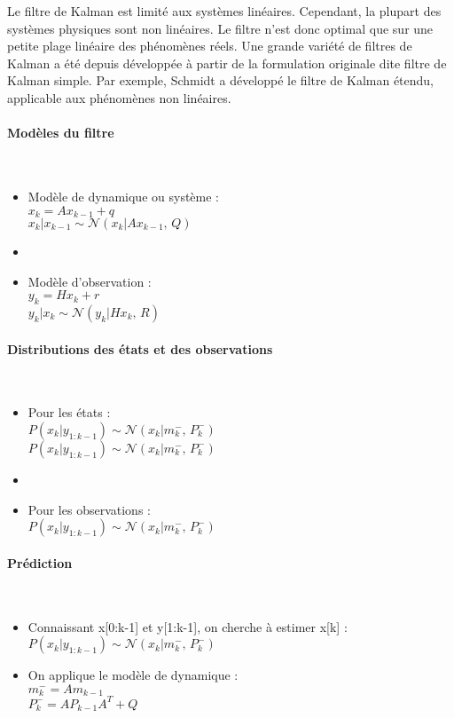 Le filtre de Kalman est limité aux systèmes linéaires. Cependant, la plupart des systèmes physiques sont non linéaires. Le filtre n'est donc optimal que sur une petite plage linéaire des phénomènes réels. Une grande variété de filtres de Kalman a été depuis développée à partir de la formulation originale dite filtre de Kalman simple. Par exemple, Schmidt a développé le filtre de Kalman étendu, applicable aux phénomènes non linéaires. 

\paragraph{Modèles du filtre}
~~\\
\begin{itemize}
	\item[] Modèle de dynamique ou système : \\
$x_k=Ax_{k-1}+q$ \\
$x_k|x_{k-1} \sim  \mathcal{N}(x_k|Ax_{k-1},\,Q)\,$
	\item[] 
	\item[] Modèle d'observation : \\
$y_k=Hx_k+r$ \\
$y_k|x_k \sim  \mathcal{N}(y_k|Hx_k,\,R)\,$
\end{itemize}

\paragraph{Distributions des états et des observations}
~~\\
\begin{itemize}
	\item[] Pour les états : \\
	$P(x_k|y_{1:k-1}) \sim \mathcal{N}(x_k|m_k^-,\,P_k^-)\,$ \\
	$P(x_k|y_{1:k-1}) \sim \mathcal{N}(x_k|m_k^-,\,P_k^-)\,$
	\item[]
	\item[] Pour les observations : \\ 
	$P(x_k|y_{1:k-1}) \sim \mathcal{N}(x_k|m_k^-,\,P_k^-)\,$
\end{itemize}

\paragraph{Prédiction}
~~\\
\begin{itemize}
	\item[] Connaissant x[0:k-1] et y[1:k-1], on cherche à estimer x[k] : \\
	$P(x_k|y_{1:k-1}) \sim \mathcal{N}(x_k|m_k^-,\,P_k^-)\,$
	\item[] On applique le modèle de dynamique : \\
	$m_k^- = Am_{k-1}$ \\
	$P_k^- = AP_{k-1}A^T+Q$ 
\end{itemize}


